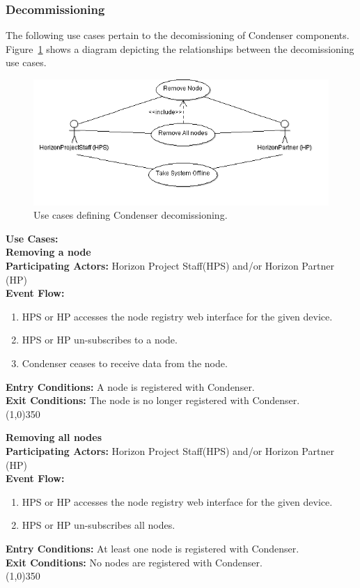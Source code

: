 \subsubsection{Decommissioning}		 
The following use cases pertain to the decomissioning of Condenser components. Figure~\ref{DecomissioningUse} shows a diagram depicting the relationships between the decomissioning use cases.
\begin{center}
	\begin{figure}[htbp]
		\includegraphics[scale=.5]{images/DecomissioningUse.png}
		\caption{Use cases defining Condenser decomissioning.\label{DecomissioningUse}}
	\end{figure}
\end{center}	
\textbf{Use Cases:}\\

	\textbf{Removing a node} \\	 
	\textbf{Participating Actors:} Horizon Project Staff(HPS) and/or Horizon Partner (HP) \\
	\textbf{Event Flow:}
	\begin{enumerate}
\item HPS or HP accesses the node registry web interface for the given device. 
\item HPS or HP un-subscribes to a node.
\item Condenser ceases to receive data from the node.
	    \end{enumerate}
		\textbf{Entry Conditions:} A node is registered with Condenser.\\
		\textbf{Exit Conditions:} The node is no longer registered with Condenser.\\
		\line(1,0){350}

	\textbf{Removing all nodes} \\	 
	\textbf{Participating Actors:}  Horizon Project Staff(HPS) and/or Horizon Partner (HP) \\
	\textbf{Event Flow:}
	\begin{enumerate}
\item HPS or HP accesses the node registry web interface for the given device. 
\item HPS or HP un-subscribes all nodes.
    \end{enumerate}
	\textbf{Entry Conditions:} At least one node is registered with Condenser.\\
	\textbf{Exit Conditions:} No nodes are registered with Condenser.\\
	\line(1,0){350}		

